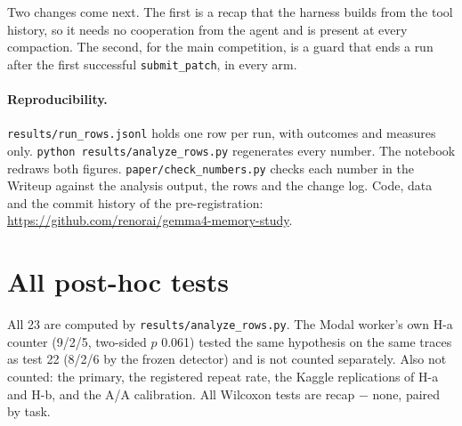 \documentclass[11pt]{article}
\newcommand{\code}[1]{\texttt{#1}}
\begin{document}
Two changes come next. The first is a recap that the harness builds from the tool history, so it
needs no cooperation from the agent and is present at every compaction. The second, for the main
competition, is a guard that ends a run after the first successful \code{submit\_patch}, in every
arm.

\paragraph{Reproducibility.} \code{results/run\_rows.jsonl} holds one row per run, with outcomes
and measures only. \code{python results/analyze\_rows.py} regenerates every number. The notebook
redraws both figures. \code{paper/check\_numbers.py} checks each number in the Writeup against the
analysis output, the rows and the change log. Code, data and the commit history of the pre-registration:
\url{https://github.com/renorai/gemma4-memory-study}.




\appendix
\section{All post-hoc tests}\label{app:posthoc}
All 23 are computed by \code{results/analyze\_rows.py}. The Modal worker's own H-a counter (9/2/5, two-sided $p$ 0.061) tested the same hypothesis on the same traces as test 22 (8/2/6 by the frozen detector) and is not counted separately. Also not counted: the primary, the
registered repeat rate, the Kaggle replications of H-a and H-b, and the A/A calibration. All
Wilcoxon tests are recap $-$ none, paired by task.

\begin{center}\small
{}
\end{center}
\end{document}
